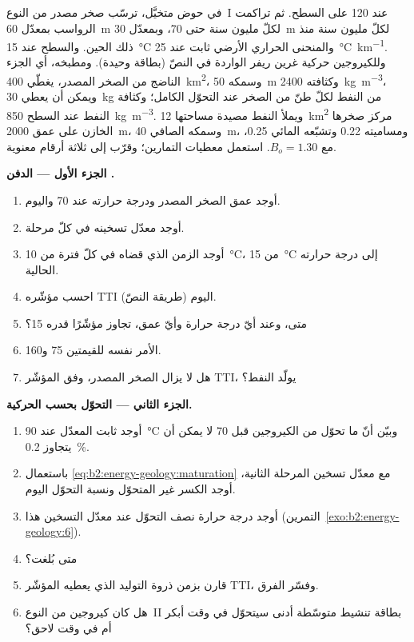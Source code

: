 \begin{problem}\label{pb:b2:energy-geology:1}
في حوض متخيَّل، ترسّب صخر مصدر من النوع~I عند \qty{120}{\Ma} على السطح.
ثم تراكمت الرواسب بمعدّل \qty{60}{m} لكلّ مليون سنة حتى \qty{70}{\Ma}، وبمعدّل \qty{30}{m}
لكلّ مليون سنة منذ ذلك الحين. والسطح عند \qty{15}{\celsius} والمنحنى الحراري الأرضي ثابت عند
\qty{25}{\celsius\per\km}. وللكيروجين حركية غرين ريفر الواردة في النصّ (بطاقة وحيدة).
ومطبخه، أي الجزء الناضج من الصخر المصدر، يغطّي \qty{400}{km^2}، وسمكه \qty{50}{m}
وكثافته \qty{2400}{kg.m^{-3}}، ويمكن أن يعطي \qty{30}{kg} من النفط لكلّ طنّ من الصخر عند
التحوّل الكامل؛ وكثافة النفط عند السطح \qty{850}{kg.m^{-3}}. ويملأ النفط مصيدة مساحتها
\qty{12}{km^2} مركز صخرها الخازن على عمق \qty{2000}{m}، وسمكه الصافي \qty{40}{m}،
ومساميته 0.22 وتشبّعه المائي 0.25، مع $B_o = 1.30$. استعمل معطيات التمارين؛ وقرّب إلى
ثلاثة أرقام معنوية.

\noindent\textbf{الجزء الأول --- الدفن .}
\begin{enumerate}
  \item أوجد عمق الصخر المصدر ودرجة حرارته عند \qty{70}{\Ma} واليوم.
  \item أوجد معدّل تسخينه في كلّ مرحلة.
  \item أوجد الزمن الذي قضاه في كلّ فترة من \qty{10}{\celsius}، من \qty{15}{\celsius} إلى
        درجة حرارته الحالية.
  \item احسب مؤشّره TTI اليوم (طريقة النصّ).
  \item متى، وعند أيّ درجة حرارة وأيّ عمق، تجاوز مؤشّرًا قدره 15؟
  \item الأمر نفسه للقيمتين 75 و160.
  \item هل لا يزال الصخر المصدر، وفق المؤشّر TTI، يولّد النفط؟
\end{enumerate}

\noindent\textbf{الجزء الثاني --- التحوّل بحسب الحركية.}
\begin{enumerate}[resume]
  \item أوجد ثابت المعدّل عند \qty{90}{\celsius} وبيّن أنّ ما تحوّل من الكيروجين قبل \qty{70}{\Ma}
        لا يمكن أن يتجاوز \qty{0.2}{\percent}.
  \item باستعمال \eqref{eq:b2:energy-geology:maturation} مع معدّل تسخين المرحلة الثانية،
        أوجد الكسر غير المتحوّل ونسبة التحوّل اليوم.
  \item أوجد درجة حرارة نصف التحوّل عند معدّل التسخين هذا (التمرين~\ref{exo:b2:energy-geology:6}).
  \item متى بُلغت؟
  \item قارن بزمن ذروة التوليد الذي يعطيه المؤشّر TTI، وفسّر الفرق.
  \item هل كان كيروجين من النوع~II بطاقة تنشيط متوسّطة أدنى سيتحوّل في وقت أبكر أم في وقت لاحق؟
\end{enumerate}


\end{problem}
